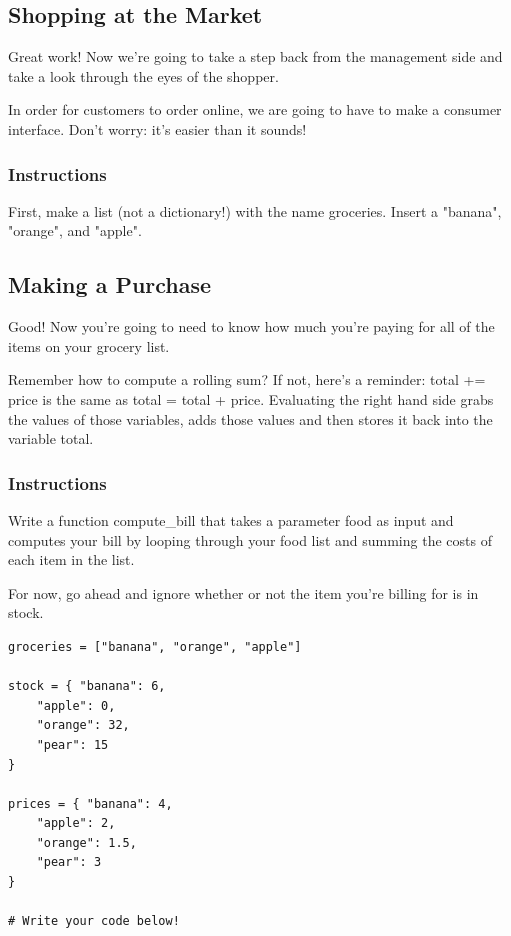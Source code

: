 \documentclass[12pt,a4paper,final,twoside,onecolumn,titlepage]{book}
\begin{document}
\subsection{Shopping at the Market}

Great work! Now we're going to take a step back from the management side and take a look through the eyes of the shopper.

In order for customers to order online, we are going to have to make a consumer interface. Don't worry: it's easier than it sounds!
\subsubsection{Instructions}

First, make a list (not a dictionary!) with the name groceries. Insert a "banana", "orange", and "apple".
\subsection{Making a Purchase}

Good! Now you're going to need to know how much you’re paying for all of the items on your grocery list.

Remember how to compute a rolling sum? If not, here's a reminder: total += price is the same as total = total + price. Evaluating the right hand side grabs the values of those variables, adds those values and then stores it back into the variable total.
\subsubsection{Instructions}

Write a function compute\_bill that takes a parameter food as input and computes your bill by looping through your food list and summing the costs of each item in the list.

For now, go ahead and ignore whether or not the item you're billing for is in stock.

\begin{lstlisting}
groceries = ["banana", "orange", "apple"]

stock = { "banana": 6,
    "apple": 0,
    "orange": 32,
    "pear": 15
}
    
prices = { "banana": 4,
    "apple": 2,
    "orange": 1.5,
    "pear": 3
}

# Write your code below!

\end{lstlisting}
\end{document}
